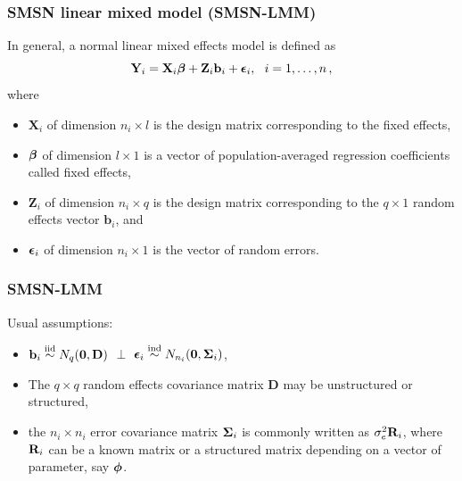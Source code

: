 \begin{frame}\frametitle{SMSN linear mixed model (SMSN-LMM)}
In general, a normal linear mixed effects model is defined as
\begin{equation}
\textbf{Y}_i=\textbf{X}_i\mbox{${\bm \beta}$}+\textbf{Z}_i\textbf{b}_i+\mbox{${ \bm \epsilon}$}_i,\,\,\,\,i=1,\ldots,n\,,
\label{modeleq}
\end{equation}
where
\begin{itemize}
    \item $\textbf{X}_i$ of dimension $n_i\times l$ is the design matrix corresponding to the fixed effects, 
    \item $\mbox{${\bm \beta}$}$ of dimension $l\times 1$ is a vector of population-averaged regression coefficients called fixed effects, \item $\textbf{Z}_i$ of dimension $n_i\times q$  is the design matrix corresponding to the $q\times 1$ random effects vector $\textbf{b}_i$, and 
    \item $\mbox{${ \bm \epsilon}$}_i$ of dimension $n_i\times 1$ is the vector of random errors.
\end{itemize}
\end{frame}
\begin{frame}\frametitle{SMSN-LMM}
Usual assumptions:
\begin{itemize}
    \item $\textbf{b}_i\stackrel {{\rm iid}}{\sim} N_q(\mathbf{0},\textbf{D})$ $\perp$ $\mbox{${ \bm \epsilon}$}_i\stackrel {{\rm ind}}{\sim} N_{n_i}(\mathbf{0},\mbox{${ \bm \Sigma}$}_i)$,
    \item The $q \times q$  random effects covariance matrix $\textbf{D}$ may be unstructured or structured,
    \item the $n_i \times n_i$ error covariance matrix $\mbox{${ \bm \Sigma}$}_i$ is commonly written as $\sigma_e^2 \mathbf{R}_i$, where $\mathbf{R}_i$ can be a known matrix or a structured matrix depending on a vector of parameter, say $\mbox{${ \bm \phi}$}$.
\end{itemize}
\end{frame}
